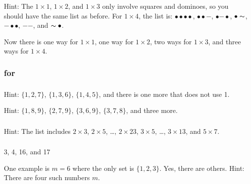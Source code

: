 \subsubsection*{ \answers} \begin{apart}
    \item Hint: The $1 \times 1$, $1 \times 2$, and $1 \times 3$ only involve squares and dominoes, so you should have the same list as before.  For $1 \times 4$, the list is:
        $\bullet\bullet\bullet\bullet$,
        $\bullet\bullet\boldsymbol{-}$,
        $\bullet\boldsymbol{-}\bullet$,
        $\bullet\thicksim$, 
        $\boldsymbol{-}\bullet\bullet$,
        $\boldsymbol{-}\boldsymbol{-}$, and
        $\thicksim\bullet$.
    \item Now there is one way for $1 \times 1$, one way for $1 \times 2$, two ways for $1 \times 3$, and three ways for $1 \times 4$.
\end{apart}


\subsubsection{\answers for  \subsetsdigits}

\subsubsection*{ \answers}
\begin{apart}
    \item Hint: $\{1,2,7\}$, $\{1,3,6\}$, $\{1,4,5\}$, and there is one more that does not use 1.
    \item Hint: $\{1,8,9\}$, $\{2,7,9\}$, $\{3,6,9\}$, $\{3,7,8\}$, and three more.
\end{apart}

\subsubsection*{ \answers}
Hint: The list includes $2 \times 3$, $2 \times 5$, \ldots, $2 \times 23$, $3 \times 5$, \ldots, $3 \times 13$, and $5 \times 7$.

\subsubsection*{ \answers}
\begin{apart}
    \item 3, 4, 16, and 17
    \item One example is $m=6$ where the only set is $\{1,2,3\}$.  Yes, there are others.  Hint: There are four such numbers $m$.
\end{apart}

